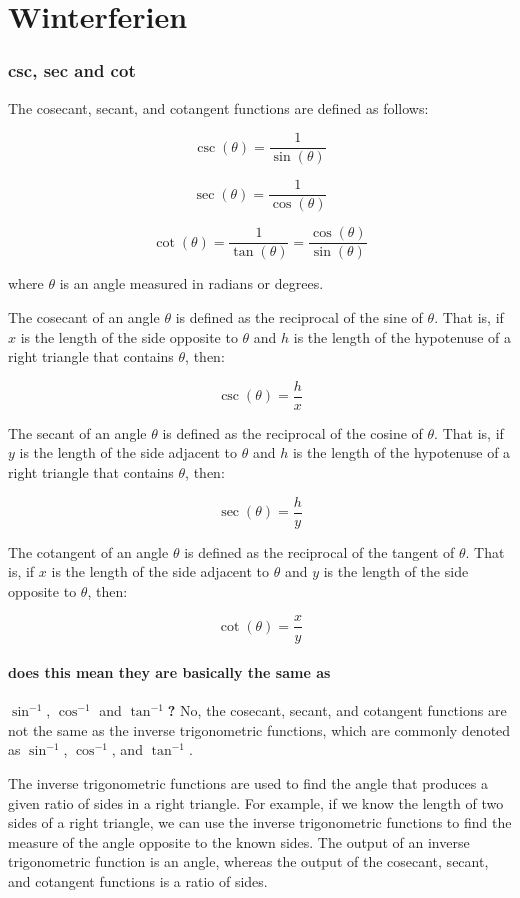 \documentclass{book}
\begin{document}
\clearpage
\section{Winterferien}
\subsubsection{csc, sec and cot} %
\label{ssub:csc-sec-and-cot}
The cosecant, secant, and cotangent functions are defined as follows:

$$\csc(\theta) = \frac{1}{\sin(\theta)}$$

$$\sec(\theta) = \frac{1}{\cos(\theta)}$$

$$\cot(\theta) = \frac{1}{\tan(\theta)} = \frac{\cos(\theta)}{\sin(\theta)}$$

where $\theta$ is an angle measured in radians or degrees.

The cosecant of an angle $\theta$ is defined as the reciprocal of the sine of
$\theta$. That is, if $x$ is the length of the side opposite to $\theta$ and
$h$ is the length of the hypotenuse of a right triangle that contains $\theta$,
then:

$$\csc(\theta) = \frac{h}{x}$$

The secant of an angle $\theta$ is defined as the reciprocal of the cosine of
$\theta$. That is, if $y$ is the length of the side adjacent to $\theta$ and
$h$ is the length of the hypotenuse of a right triangle that contains $\theta$,
then:

$$\sec(\theta) = \frac{h}{y}$$

The cotangent of an angle $\theta$ is defined as the reciprocal of the tangent
of $\theta$. That is, if $x$ is the length of the side adjacent to $\theta$ and
$y$ is the length of the side opposite to $\theta$, then:

$$\cot(\theta) = \frac{x}{y}$$

\paragraph{does this mean they are basically the same as} $\sin^{-1}$, $\cos^{-1}$ and $\tan^{-1}$\textbf{?}
No, the cosecant, secant, and cotangent functions are not the same as the
inverse trigonometric functions, which are commonly denoted as $\sin^{-1}$,
$\cos^{-1}$, and $\tan^{-1}$.

The inverse trigonometric functions are used to find the angle that produces a
given ratio of sides in a right triangle. For example, if we know the length of
two sides of a right triangle, we can use the inverse trigonometric functions
to find the measure of the angle opposite to the known sides. The output of an
inverse trigonometric function is an angle, whereas the output of the cosecant,
secant, and cotangent functions is a ratio of sides.
\end{document}
